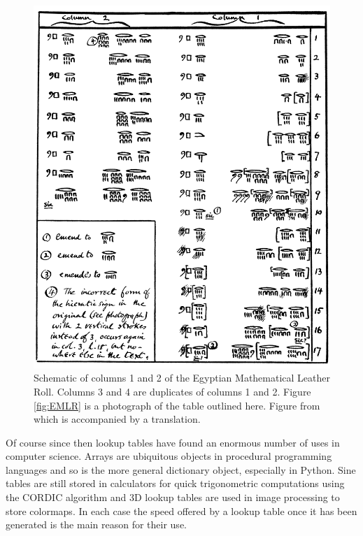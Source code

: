 \begin{figure}
  \centering
  \includegraphics[width=\textwidth]{gfx/EMLRschematic}
  \caption[Schematic of columns 1 and 2 of the Egyptian Mathematical Leather Roll.]
  {Schematic of columns 1 and 2 of the Egyptian Mathematical Leather Roll. Columns 3 and 4 are duplicates of columns 1 and 2. Figure \ref{fig:EMLR} is a photograph of the table outlined here. Figure from \citet{Glanville27} which is accompanied by a translation.}
  \label{fig:EMLRschematic}
\end{figure}

Of course since then lookup tables have found an enormous number of uses in computer science. Arrays are ubiquitous objects in procedural programming languages and so is the more general dictionary object, especially in Python. Sine tables are still stored in calculators for quick trigonometric computations using the CORDIC algorithm and 3D lookup tables are used in image processing to store colormaps. In each case the speed offered by a lookup table once it has been generated is the main reason for their use.

